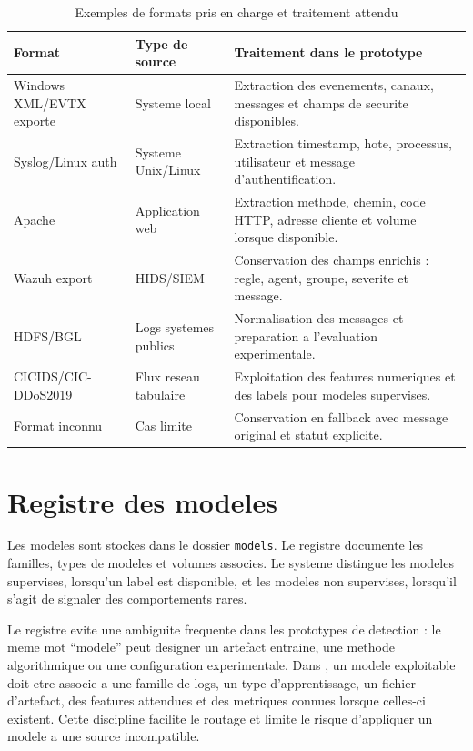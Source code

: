 \begin{table}[H]
\centering
\caption{Exemples de formats pris en charge et traitement attendu}
\label{tab:formats-implementation}
\scriptsize
\begin{tabularx}{\textwidth}{p{3cm}p{3cm}X}
\toprule
\textbf{Format} & \textbf{Type de source} & \textbf{Traitement dans le prototype} \\
\midrule
Windows XML/EVTX exporte & Systeme local & Extraction des evenements, canaux, messages et champs de securite disponibles. \\
Syslog/Linux auth & Systeme Unix/Linux & Extraction timestamp, hote, processus, utilisateur et message d'authentification. \\
Apache & Application web & Extraction methode, chemin, code HTTP, adresse cliente et volume lorsque disponible. \\
Wazuh export & HIDS/SIEM & Conservation des champs enrichis : regle, agent, groupe, severite et message. \\
HDFS/BGL & Logs systemes publics & Normalisation des messages et preparation a l'evaluation experimentale. \\
CICIDS/CIC-DDoS2019 & Flux reseau tabulaire & Exploitation des features numeriques et des labels pour modeles supervises. \\
Format inconnu & Cas limite & Conservation en fallback avec message original et statut explicite. \\
\bottomrule
\end{tabularx}
\end{table}

\section{Registre des modeles}
Les modeles sont stockes dans le dossier \texttt{models}. Le registre documente les familles, types de modeles et volumes associes. Le systeme distingue les modeles supervises, lorsqu'un label est disponible, et les modeles non supervises, lorsqu'il s'agit de signaler des comportements rares.

Le registre evite une ambiguite frequente dans les prototypes de detection : le meme mot ``modele'' peut designer un artefact entraine, une methode algorithmique ou une configuration experimentale. Dans \logminer{}, un modele exploitable doit etre associe a une famille de logs, un type d'apprentissage, un fichier d'artefact, des features attendues et des metriques connues lorsque celles-ci existent. Cette discipline facilite le routage et limite le risque d'appliquer un modele a une source incompatible.

